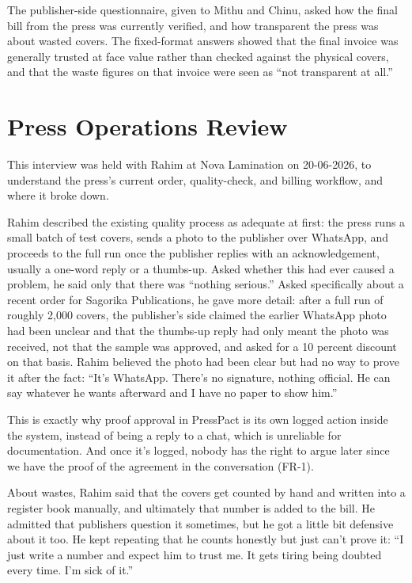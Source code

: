 \documentclass{scrreprt}
\begin{document}
The publisher-side questionnaire, given to Mithu and Chinu, asked how the final bill from the press was currently verified, and how transparent the press was about wasted covers. The fixed-format answers showed that the final invoice was generally trusted at face value rather than checked against the physical covers, and that the waste figures on that invoice were seen as ``not transparent at all.''

\section{Press Operations Review}
This interview was held with Rahim at Nova Lamination on 20-06-2026, to understand the press's current order, quality-check, and billing workflow, and where it broke down.

Rahim described the existing quality process as adequate at first: the press runs a small batch of test covers, sends a photo to the publisher over WhatsApp, and proceeds to the full run once the publisher replies with an acknowledgement, usually a one-word reply or a thumbs-up. Asked whether this had ever caused a problem, he said only that there was ``nothing serious.'' Asked specifically about a recent order for Sagorika Publications, he gave more detail: after a full run of roughly 2,000 covers, the publisher's side claimed the earlier WhatsApp photo had been unclear and that the thumbs-up reply had only meant the photo was received, not that the sample was approved, and asked for a 10 percent discount on that basis. Rahim believed the photo had been clear but had no way to prove it after the fact: ``It's WhatsApp. There's no signature, nothing official. He can say whatever he wants afterward and I have no paper to show him.''

This is exactly why proof approval in PressPact is its own logged action inside the system, instead of being a reply to a chat, which is unreliable for documentation. And once it's logged, nobody has the right to argue later since we have the proof of the agreement in the conversation (FR-1).

About wastes, Rahim said that the covers get counted by hand and written into a register book manually, and ultimately that number is added to the bill. He admitted that publishers question it sometimes, but he got a little bit defensive about it too. He kept repeating that he counts honestly but just can't prove it: ``I just write a number and expect him to trust me. It gets tiring being doubted every time. I'm sick of it.''
\end{document}
